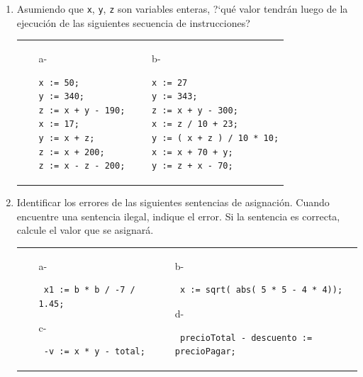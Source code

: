\documentclass[a4paper,10pt]{article}
\begin{document}
\begin{enumerate}
\item Asumiendo que \verb=x=, \verb=y=, \verb=z= son variables enteras, ?`qu\'e valor tendr\'an luego de la ejecuci\'on de las siguientes secuencia de instrucciones?\\
\begin{tabular}{p{} p{}}
    \begin{itemize}
        \item[a-] 
\begin{verbatim} 
x := 50;
y := 340;
z := x + y - 190;
x := 17;
y := x + z;
z := x + 200;
z := x - z - 200;
\end{verbatim}
    \end{itemize}
&
    \begin{itemize}
        \item[b-] 
\begin{verbatim}
x := 27
y := 343;
z := x + y - 300;
x := z / 10 + 23;
y := ( x + z ) / 10 * 10;
x := x + 70 + y;
y := z + x - 70;
\end{verbatim}
    \end{itemize}
\\
\end{tabular}

\item Identificar los errores de las siguientes sentencias de asignaci\'on. Cuando encuentre una sentencia ilegal, indique el error. Si la sentencia es correcta, calcule el valor que se asignar\'a.

\begin{tabular}{p{} p{}}
    \begin{itemize}
        \item[a-] \begin{verbatim} x1 := b * b / -7 / 1.45;\end{verbatim}
        \item[c-] \begin{verbatim} -v := x * y - total;\end{verbatim}
    \end{itemize}
&
    \begin{itemize}
        \item[b-] \begin{verbatim} x := sqrt( abs( 5 * 5 - 4 * 4));\end{verbatim}
        \item[d-] \begin{verbatim} precioTotal - descuento := precioPagar;\end{verbatim}
    \end{itemize}
\\
\end{tabular}	


\end{enumerate}
\end{document}
